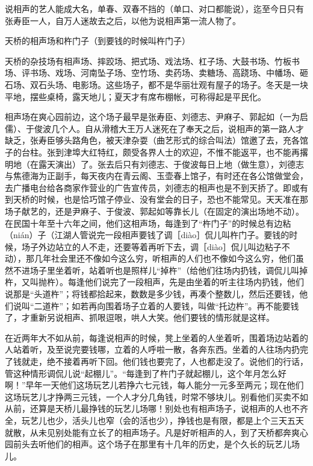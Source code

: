\documentclass[12pt,UTF8]{ctexbook}
\begin{document}
说相声的艺人能成大名，单春、双春不挡的（单口、对口都能说），迄至今日只有张寿臣一人，自万人迷故去之后，以他为说相声第一流人物了。





天桥的相声场和杵门子（到要钱的时候叫杵门子）


天桥的杂技场有相声场、摔跤场、把式场、戏法场、杠子场、大鼓书场、竹板书场、评书场、戏场、河南坠子场、空竹场、卖药场、卖糖场、高跷场、中幡场、砸石场、双石头场、电影场。这些场子，都不是华丽壮观有屋子的场子。冬天是一块平地，摆些桌椅，露天地儿；夏天才有席布棚帐，可称得起是平民化。

相声场在爽心园前边，这个场子最早是张寿臣、刘德志、尹麻子、郭起如（一为启儒）、于俊波几个人。自从滑稽大王万人迷死在了奉天之后，说相声的第一路人才缺乏，张寿臣够头路角色，被天津杂耍（曲艺形式的综合叫法）馆邀了去，充各馆子的台柱。张到津埠大红特红，颇受各界人士的欢迎，不惟不能返平，也不能再撂明地（在露天演出）了。张去后只有刘德志、于俊波每日上地（做生意），刘德志与焦德海为正副手，每天夜内在青云阁、玉壶春上馆子，有时还在各公馆做堂会，去广播电台给各商家作营业的广告宣传员，刘德志的相声也是不到天挢了。即或有到天桥的时候，也是恰巧馆子停业、没有堂会的日子，恐也不能常见。天天准在那场子献艺的，还是尹麻子、于俊波、郭起如等靠长儿（在固定的演出场地不动）。在民国十年至十六年之间，他们这相声场，每逢到了“杵门子”的时候总有边粘（nián）子（江湖人管说完一段相声要钱了调［diào］侃儿叫杵门子。要钱的时候，场子外边站立的人不走，还要等着再听下去，调［diào］侃儿叫边粘子不动），那几年社会里还不像如今这么穷，听相声的人们也不像如今这么穷，他们虽然不进场子里坐着听，站着听也是照样儿“掉杵”（给他们往场内扔钱，调侃儿叫掉杵，又叫抛杵）。每逢他们说完了一段相声，先是由坐着的听主往场内扔钱，他们说那是“头道杵”；将钱都拾起来，数数是多少钱，再凑个整数儿，然后还要钱，他们说叫“二道杵”；如若再向围着场子立着的人要钱，叫做“托边杵”。再不能要钱了，才重新另说相声、抓哏逗哏，哄人大笑。他们要钱的情形就是这样。

在近两年大不如从前，每逢说相声的时候，凳上坐着的人坐着听，围着场边站着的人站着听，及至说完要钱哪，立着的人呼啦一散，各奔东西。坐着的人往场内扔完了钱就走，绝不接着再听下回。他们钱也要完了，人也都走没了。说他们的行话，管这种情形调侃儿说“起棚儿”。“每逢到了杵门子就起棚儿，这个年月怎么好啊！”早年一天他们这场玩艺儿若挣六七元钱，每人能分一元多至两元；现在他们这场玩艺儿才挣两三元钱，一个人才分几角钱，时常不够块儿。别看他们买卖不如从前，还算是天桥儿最挣钱的玩艺儿场哪！别处也有相声场子，说相声的人也不齐全，玩艺儿也少，活头儿也窄（会的活也少），挣钱也是有限，都是上个三天五天就散，从未见别处能有立长了的相声场子。凡是好听相声的人，到了天桥都奔爽心园前头去听他们的相声。这个场子在那里有十几年的历史，是个久长的玩艺儿场儿。
\end{document}
